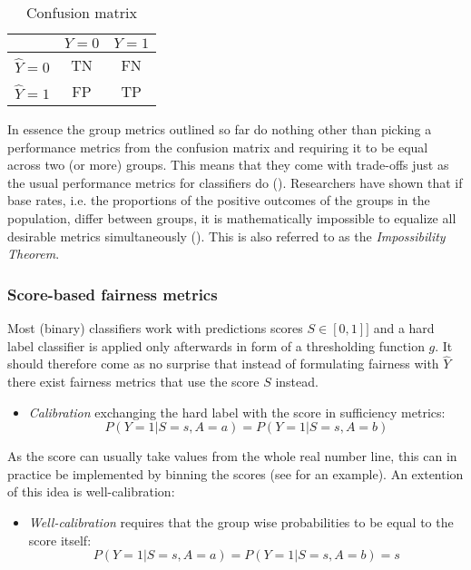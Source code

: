 \begin{table}
    \centering
    \renewcommand{\arraystretch}{1.5}
    \begin{tabular}{|c|c|c|}
        \hline
        & \(Y = 0\) & \(Y = 1\) \\
        \hline
        \(\hat{Y} = 0\) & TN & FN \\
        \hline
        \(\hat{Y} = 1\) & FP & TP \\
        \hline
    \end{tabular}
    \caption{Confusion matrix}
    \label{tab:confusionMatrix}
\end{table}


In essence the group metrics outlined so far do nothing other than picking a performance metrics from the confusion matrix and requiring it to be equal across two (or more) groups.
This means that they come with trade-offs just as the usual performance metrics for classifiers do (\cite{kleinberg2017}). Researchers have shown that if base rates, i.e. the proportions of the positive outcomes of the groups in the population, differ between groups, it is mathematically impossible to equalize all desirable metrics simultaneously (\cite{Chouldechova2016FairPW}). This is also referred to as the \textit{Impossibility Theorem}.

\subsubsection*{Score-based fairness metrics}
Most (binary) classifiers work with predictions scores $S \in [0,1]]$ and a hard label classifier is applied only afterwards in form of a thresholding function $g$. It should therefore come as no surprise that instead of formulating fairness with $\hat{Y}$ there exist fairness metrics that use the score $S$ instead.
\begin{itemize}
    \item \textit{Calibration} exchanging the hard label with the score in sufficiency metrics:  $$P(Y = 1 | S = s, A = a) = P(Y = 1 | S = s, A = b)$$
\end{itemize}
As the score can usually take values from the whole real number line, this can in practice be implemented by binning the scores (see \cite{verma2018} for an example). An extention of this idea is well-calibration:
\begin{itemize}
    \item \textit{Well-calibration} requires that the group wise probabilities to be equal to the score itself: $$P(Y = 1 | S = s, A = a) = P(Y = 1 | S = s, A = b) = s$$
\end{itemize}

